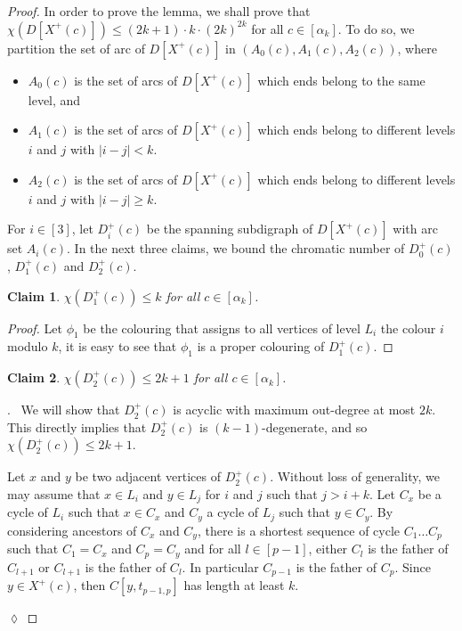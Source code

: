 \documentclass[utf8,10pt]{article}
\theoremstyle{plain}
\newtheorem{claim}{Claim}[theorem]
\theoremstyle{definition}
\theoremstyle{remark}
\newenvironment{subproof}{\par\noindent {\it Subproof}.\ }{\hfill$\lozenge$\par\vspace{11pt}}
\newcommand{\dr}{ (2k+1)\cdot k \cdot (2k)^{2k}}
\begin{document}
\begin{proof}
In order to prove the lemma, we shall prove that $\chi(D[X^+(c)]) \leq \dr$ for all $c\in [\alpha_k]$.
To do so, we partition the set of arc of $D[X^+(c)]$ in $(A_0(c),A_1(c), A_2(c))$, where
\begin{itemize}
	\item $A_0(c)$ is the set of arcs of $D[X^+(c)]$ which ends belong to the same level, and
	\item $A_1(c)$ is the set of arcs of $D[X^+(c)]$ which ends belong to different levels $i$ and $j$ with $ | i - j| < k$.	
	\item $A_2(c)$ is the set of arcs of $D[X^+(c)]$ which ends belong to different levels $i$ and $j$ with $ | i - j| \geq k$.
\end{itemize} 

For $i \in [3]$, let $D^+_i(c)$ be the spanning subdigraph of $D[X^+(c)]$ with arc set $A_i(c)$.
In the next three claims, we bound the chromatic number of $D^+_0(c)$, $D^+_1(c)$ and  $D^+_2(c)$.

\begin{claim}\label{claim:D1}
$\chi(D^+_1(c))\leq k$ for all $c\in [\alpha_k]$.
\end{claim}
\begin{proof}
Let $\phi_1$ be the colouring that assigns to all vertices of level $L_i$ the colour $i$ modulo $k$, it 
is easy to see that $\phi_1$ is a proper colouring of $D^+_1(c)$.
\end{proof}

\begin{claim}\label{claim:D2}
$\chi(D^+_2(c))\leq 2k+1$ for all $c\in [\alpha_k]$.
\end{claim}

\begin{subproof}
We will show that $D^+_2(c)$ is acyclic with maximum out-degree at most $2k$.  This directly implies that  $D^+_2(c)$ is $(k-1)$-degenerate, and so $\chi(D^+_2(c)) \leq 2k+1$.

Let $x$ and $y$ be two adjacent vertices of $D^+_2(c)$. Without loss of generality, we may assume that $x\in L_i$ and $y\in L_j$ for $i$ and $j$ such that $ j> i+k$.
Let $C_x$ be a cycle of $L_i$ such that $x \in C_x$ and $C_y$ a cycle of $L_j$ such that $y \in C_y$.
By considering ancestors of $C_x$ and $C_y$, there is a shortest sequence of cycle $C_1 \dots C_p$ such that $C_1 = C_x$ and $C_p = C_y$ and for all $l\in [p-1]$, either $C_l$ is the father of $C_{l+1}$ or $C_{l+1}$ is the father of $C_l$.
In particular $C_{p-1}$ is the father of $C_p$. Since $y\in X^+(c)$, then $C[y,t_{p-1,p}]$ has length at least $k$.


\end{subproof}
\end{proof}
\end{document}
